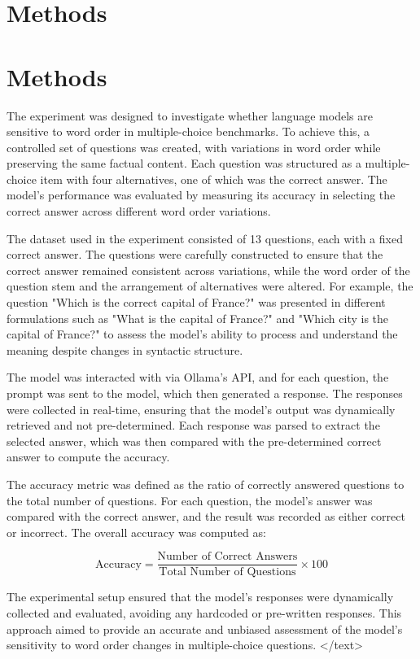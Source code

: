 \documentclass{article}
\begin{document}
\section{Methods}
\section{Methods}

The experiment was designed to investigate whether language models are sensitive to word order in multiple-choice benchmarks. To achieve this, a controlled set of questions was created, with variations in word order while preserving the same factual content. Each question was structured as a multiple-choice item with four alternatives, one of which was the correct answer. The model's performance was evaluated by measuring its accuracy in selecting the correct answer across different word order variations.

The dataset used in the experiment consisted of 13 questions, each with a fixed correct answer. The questions were carefully constructed to ensure that the correct answer remained consistent across variations, while the word order of the question stem and the arrangement of alternatives were altered. For example, the question "Which is the correct capital of France?" was presented in different formulations such as "What is the capital of France?" and "Which city is the capital of France?" to assess the model's ability to process and understand the meaning despite changes in syntactic structure.

The model was interacted with via Ollama's API, and for each question, the prompt was sent to the model, which then generated a response. The responses were collected in real-time, ensuring that the model's output was dynamically retrieved and not pre-determined. Each response was parsed to extract the selected answer, which was then compared with the pre-determined correct answer to compute the accuracy.

The accuracy metric was defined as the ratio of correctly answered questions to the total number of questions. For each question, the model's answer was compared with the correct answer, and the result was recorded as either correct or incorrect. The overall accuracy was computed as:

$$
\text{Accuracy} = \frac{\text{Number of Correct Answers}}{\text{Total Number of Questions}} \times 100
$$

The experimental setup ensured that the model's responses were dynamically collected and evaluated, avoiding any hardcoded or pre-written responses. This approach aimed to provide an accurate and unbiased assessment of the model's sensitivity to word order changes in multiple-choice questions.
</text>
\end{document}
